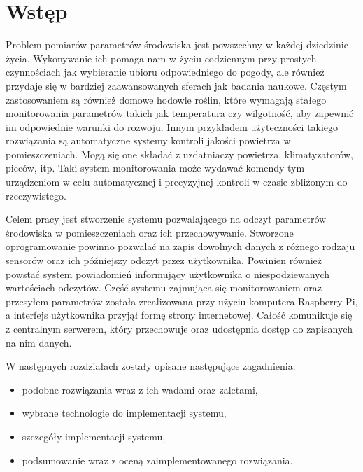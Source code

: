 \chapter{Wstęp}

Problem pomiarów parametrów środowiska jest powszechny w każdej dziedzinie życia.
Wykonywanie ich pomaga nam w życiu codziennym przy prostych czynnościach jak
wybieranie ubioru odpowiedniego do pogody, ale również przydaje się w bardziej
zaawansowanych sferach jak badania naukowe. Częstym zastosowaniem są również
domowe hodowle roślin, które wymagają stałego monitorowania parametrów
takich jak temperatura czy wilgotność, aby zapewnić im odpowiednie warunki
do rozwoju. Innym przykładem użyteczności takiego rozwiązania są automatyczne
systemy kontroli jakości powietrza w pomieszczeniach. Mogą się one składać
z uzdatniaczy powietrza, klimatyzatorów, pieców, itp. Taki system monitorowania
może wydawać komendy tym urządzeniom w celu automatycznej i precyzyjnej kontroli
w czasie zbliżonym do rzeczywistego.

Celem pracy jest stworzenie systemu pozwalającego na odczyt parametrów środowiska
w pomieszczeniach oraz ich przechowywanie. Stworzone oprogramowanie powinno pozwalać
na zapis dowolnych danych z różnego rodzaju sensorów oraz ich późniejszy odczyt
przez użytkownika. Powinien również powstać system powiadomień informujący
użytkownika o niespodziewanych wartościach odczytów.
Część systemu zajmująca się monitorowaniem oraz przesyłem
parametrów została zrealizowana przy użyciu komputera Raspberry Pi, a
interfejs użytkownika przyjął formę strony internetowej. Całość komunikuje się
z centralnym serwerem, który przechowuje oraz udostępnia dostęp do
zapisanych na nim danych.

W następnych rozdziałach zostały opisane następujące zagadnienia:
\begin{itemize}
  \item podobne rozwiązania wraz z ich wadami oraz zaletami,
  \item wybrane technologie do implementacji systemu,
  \item szczegóły implementacji systemu,
  \item podsumowanie wraz z oceną zaimplementowanego rozwiązania.
\end{itemize}
